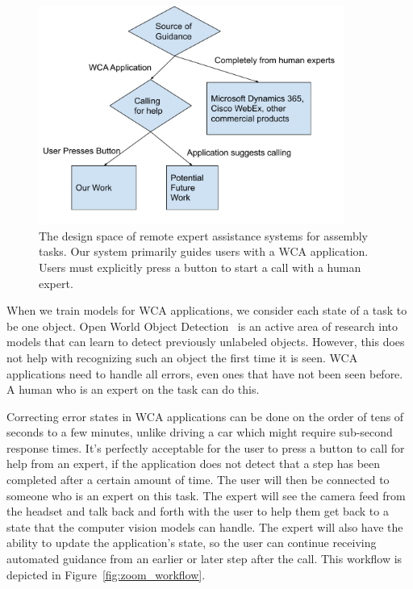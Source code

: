 \begin{figure}[h]
  \includegraphics[width=10cm]{figures/design_space.pdf}
  \caption[
  The design space of remote expert assistance systems for assembly tasks
  ]{
    The design space of remote expert assistance systems for assembly tasks.
    Our system primarily guides users with a WCA application.
    Users must explicitly press a button to start a call with a human expert.
  }\label{fig:design_space}
\end{figure}

When we train models for WCA applications, we consider each state of a task
to be one object. Open World Object Detection~\cite{joseph2021open} is an active
area of research into models that can learn to detect previously unlabeled
objects. However, this does not help with recognizing such an object the first
time it is seen. WCA applications need to handle all errors, even ones that
have not been seen before. A human who is an expert on the task can do this.

Correcting error states in WCA applications can be done on the order of tens
of seconds to a few
minutes, unlike driving a car which might require sub-second response times.
It's perfectly acceptable for the user to press a button to call for help from
an expert, if the application does not detect that a step has been completed
after a certain amount of time. The user will then be connected to someone who
is an expert on this task. The expert will
see the camera feed from the headset and talk back and forth with the user to
help them get back to a state that the computer vision models can handle.
The expert will also have the ability to update the application's state, so the
user can continue receiving automated guidance from an earlier or later
step after the call.
This workflow is depicted in Figure~\ref{fig:zoom_workflow}.

